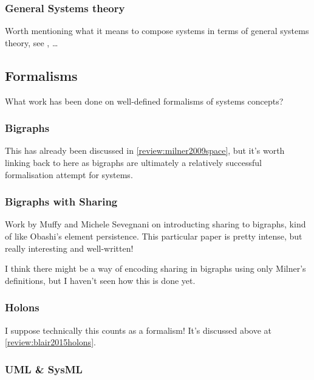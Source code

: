 \documentclass[12pt]{article}
\begin{document}

\subsubsection{General Systems theory}

Worth mentioning what it means to compose systems in terms of general systems
theory, see \cite{boulding1956general}, \cite{polanyi1968life}\ldots



\subsection{Formalisms}

What work has been done on well-defined formalisms of systems concepts?

\subsubsection{Bigraphs}

This has already been discussed in \ref{review:milner2009space}, but it's worth
linking back to here as bigraphs are ultimately a relatively successful
formalisation attempt for systems.

\subsubsection{Bigraphs with Sharing}

Work by Muffy and Michele Sevegnani on introducting sharing to bigraphs, kind of
like Obashi's element persistence. \cite{sevegnani2015bigraphs} This particular
paper is pretty intense, but really interesting and well-written!\par

I think there might be a way of encoding sharing in bigraphs using only Milner's
definitions, but I haven't seen how this is done yet. 

\subsubsection{Holons}  %
I suppose technically this counts as a formalism! It's discussed above at \ref{review:blair2015holons}.

\subsubsection{UML \& SysML}  %
\end{document}
